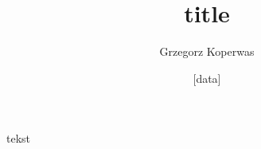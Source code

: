 \documentclass[a4paper,12pt]{article}
\title{title}
\author{Grzegorz Koperwas}
\date{[data]}
\begin{document}
	tekst
\end{document}
